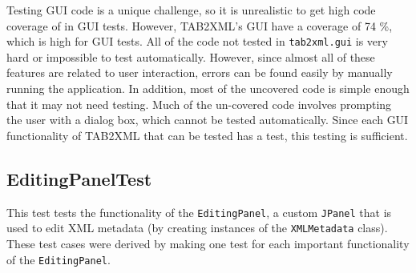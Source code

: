 \documentclass[11pt]{article}
\begin{document}
Testing GUI code is a unique challenge, so it is unrealistic to get high code coverage of in GUI tests.  However, TAB2XML's GUI have a coverage of 74 \%, which is high for GUI tests.  All of the code not tested in \texttt{tab2xml.gui} is very hard or impossible to test automatically.  However, since almost all of these features are related to user interaction, errors can be found easily by manually running the application.  In addition, most of the uncovered code is simple enough that it may not need testing.  Much of the un-covered code involves prompting the user with a dialog box, which cannot be tested automatically.  Since each GUI functionality of TAB2XML that can be tested has a test, this testing is sufficient.
\subsection{EditingPanelTest}
\label{sec:org25d9ecf}
This test tests the functionality of the \texttt{EditingPanel}, a custom \texttt{JPanel} that is used to edit XML metadata (by creating instances of the \texttt{XMLMetadata} class).  These test cases were derived by making one test for each important functionality of the \texttt{EditingPanel}.
\end{document}
